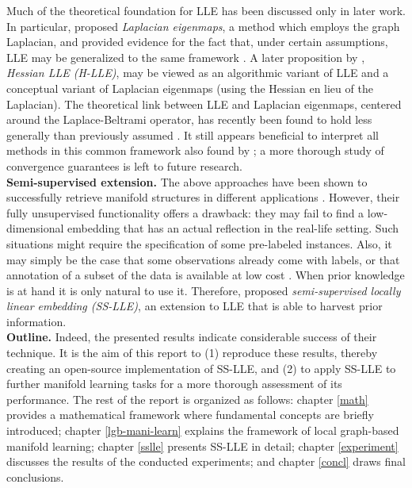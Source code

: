 Much of the theoretical foundation for LLE has been discussed only in later 
work.
In particular, \citet{belkinniyogi2001} proposed \textit{Laplacian eigenmaps}, 
a method which employs the graph Laplacian, and provided evidence for the fact 
that, under certain assumptions, LLE may be generalized to the same framework 
\citep{belkinniyogi2003}.
A later proposition by \citet{donohogrimes2003}, \textit{Hessian LLE (H-LLE)}, 
may be viewed as an algorithmic variant of LLE and a conceptual variant of 
Laplacian eigenmaps (using the Hessian en lieu of the Laplacian).
The theoretical link between LLE and Laplacian eigenmaps, centered around 
the Laplace-Beltrami operator, has recently been found to hold less generally 
than previously assumed \citep{wuwu2018}. 
It still appears beneficial to interpret all methods in this common framework 
also found by \citet{bengioetal2003}; a more thorough study of convergence 
guarantees is left to future research.
\\

\textbf{Semi-supervised extension.}
The above approaches have been shown to successfully retrieve manifold 
structures in different applications \citep{wuwu2018}.
However, their fully unsupervised functionality offers a drawback: they may fail
to find a low-dimensional embedding that has an actual reflection in the 
real-life setting.
Such situations might require the specification of some pre-labeled instances.
Also, it may simply be the case that some observations already come with labels, 
or that annotation of a subset of the data is available at low cost 
\citep{yangetal2006}.
When prior knowledge is at hand it is only natural to use it.
Therefore, \citet{yangetal2006} proposed \textit{semi-supervised locally linear 
embedding (SS-LLE)}, an extension to LLE that is able to harvest prior 
information.
\\

\textbf{Outline.}
Indeed, the presented results indicate considerable success of their technique.
It is the aim of this report to (1) reproduce these results, thereby creating
an open-source implementation of SS-LLE, and (2) to apply SS-LLE to further 
manifold learning tasks for a more thorough assessment of its performance. 
The rest of the report is organized as follows: chapter \ref{math} 
provides a mathematical framework where fundamental concepts are briefly 
introduced; chapter \ref{lgb-mani-learn} explains the framework of local 
graph-based manifold learning; chapter \ref{sslle} presents SS-LLE in detail; 
chapter \ref{experiment} discusses the results of the conducted experiments; and 
chapter \ref{concl} draws final conclusions.







